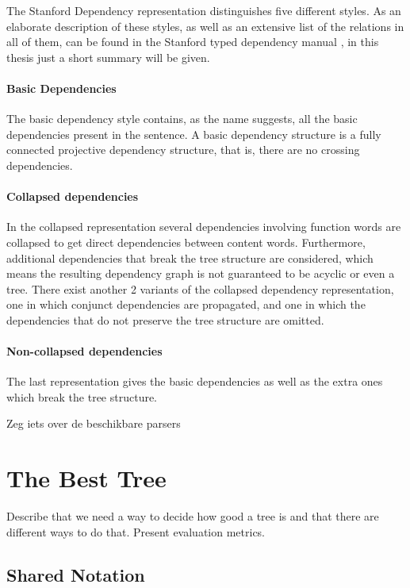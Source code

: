 \documentclass{report}
\theoremstyle{definition}
\theoremstyle{plain}
\begin{document}

The Stanford Dependency representation distinguishes five different styles. As an elaborate description of these styles, as well as an extensive list of the relations in all of them, can be found in the Stanford typed dependency manual \citep{de2008stanford}, in this thesis just a short summary will be given.
\paragraph{Basic Dependencies} The basic dependency style contains, as the name suggests, all the basic dependencies present in the sentence. A basic dependency structure is a fully connected projective dependency structure, that is, there are no crossing dependencies.
\paragraph{Collapsed dependencies} In the collapsed representation several dependencies involving function words are collapsed to get direct dependencies between content words. Furthermore, additional dependencies that break the tree structure are considered, which means the resulting dependency graph is not guaranteed to be acyclic or even a tree. There exist another 2 variants of the collapsed dependency representation, one in which conjunct dependencies are propagated, and one in which the dependencies that do not preserve the tree structure are omitted.
\paragraph{Non-collapsed dependencies} The last representation gives the basic dependencies as well as the extra ones which break the tree structure.

Zeg iets over de beschikbare parsers \cite{de2006generating}

\section{The Best Tree}

Describe that we need a way to decide how good a tree is and that there are different ways to do that. Present evaluation metrics.

\subsection{Shared Notation}
\end{document}
